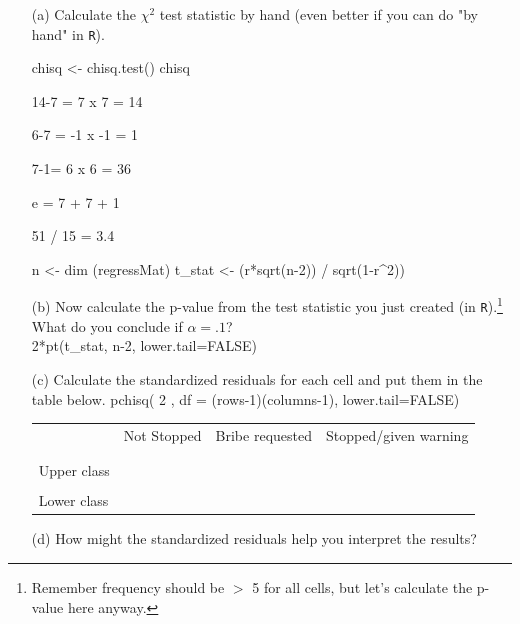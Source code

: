 \documentclass[12pt,letterpaper]{article}
\begin{document}
	\begin{enumerate}
		
		\item [(a)]
		Calculate the $\chi^2$ test statistic by hand (even better if you can do "by hand" in \texttt{R}).\\
		\vspace{7cm}
		
		chisq <- chisq.test()
		chisq
		
		14-7 = 7 x 7 = 14
		
		6-7 = -1 x -1 = 1
		
		7-1= 6 x 6 = 36
		
		e = 7 + 7 + 1
		
		51 / 15 = 3.4
		
		
		n <- dim (regressMat)
		t_stat <- (r*sqrt(n-2)) / sqrt(1-r^2))
		
		
		
		\item [(b)]
		Now calculate the p-value from the test statistic you just created (in \texttt{R}).\footnote{Remember frequency should be $>$ 5 for all cells, but let's calculate the p-value here anyway.}  What do you conclude if $\alpha = .1$?\\
		
		2*pt(t_stat, n-2, lower.tail=FALSE)
		
		
		
		\newpage
		\item [(c)] Calculate the standardized residuals for each cell and put them in the table below.
		\vspace{1cm}
		pchisq(
		2
		, df = (rows-1)(columns-1),
		lower.tail=FALSE)
		\begin{table}[h]
			\centering
			\begin{tabular}{l | c c c }
				& Not Stopped & Bribe requested & Stopped/given warning \\
				\\[-1.8ex] 
				\hline \\[-1.8ex]
				Upper class  &  &  &  \\
				\\
				Lower class &  &   &   \\
				
			\end{tabular}
		\end{table}
		
		
		\vspace{7cm}
		\item [(d)] How might the standardized residuals help you interpret the results?  
		
	\end{enumerate}
	\newpage
	
\end{document}
